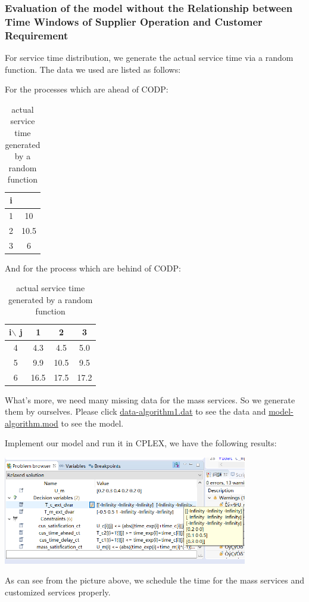 \documentclass[12pt,a4paper]{article}
\begin{document}
\subsubsection{Evaluation of the model without the Relationship between Time Windows of Supplier Operation and Customer Requirement}
For service time distribution, we generate the actual service time via a random function. The data we used are listed as follows:
\begin{table}[!htbp]
  \centering
  \caption{actual service time generated by a random function}
  For the processes which are ahead of CODP:\\
  \begin{tabular}{c|c}
    \hline
    i& \\
    \hline
    1& 10\\
    2& 10.5\\
    3& 6\\
    \hline
  \end{tabular}

  And for the process which are behind of CODP:\\
  \begin{tabular}{c|c|c|c}
    \hline
    i$\backslash$ j&1 &2 &3\\
    \hline
    4& 4.3& 4.5& 5.0\\
    \hline
    5& 9.9& 10.5& 9.5\\
    \hline
    6& 16.5& 17.5& 17.2\\
    \hline
  \end{tabular}
\end{table}

What's more, we need many missing data for the mass services. So we generate them by ourselves. Please click \href{run:data-algorithm1.dat}{data-algorithm1.dat} to see the data and \href{run:model-algorithm.mod}{model-algorithm.mod} to see the model.

Implement our model and run it in CPLEX, we have the following results:
\begin{center}
\includegraphics[width=0.8\textwidth]{figures/sol_alg1}
\end{center}
As can see from the picture above, we schedule the time for the mass services and customized services properly.
\end{document}
